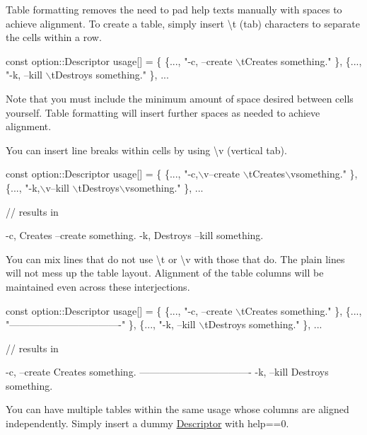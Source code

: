 Table formatting removes the need to pad help texts manually with spaces to achieve alignment. To create a table, simply insert \textbackslash{}t (tab) characters to separate the cells within a row.


\begin{DoxyCode}
\textcolor{keyword}{const} option::Descriptor usage[] = \{
\{..., \textcolor{stringliteral}{"-c, --create  \(\backslash\)tCreates something."} \},
\{..., \textcolor{stringliteral}{"-k, --kill  \(\backslash\)tDestroys something."} \}, ...
\end{DoxyCode}


Note that you must include the minimum amount of space desired between cells yourself. Table formatting will insert further spaces as needed to achieve alignment.

You can insert line breaks within cells by using \textbackslash{}v (vertical tab).


\begin{DoxyCode}
\textcolor{keyword}{const} option::Descriptor usage[] = \{
\{..., \textcolor{stringliteral}{"-c,\(\backslash\)v--create  \(\backslash\)tCreates\(\backslash\)vsomething."} \},
\{..., \textcolor{stringliteral}{"-k,\(\backslash\)v--kill  \(\backslash\)tDestroys\(\backslash\)vsomething."} \}, ...

\textcolor{comment}{// results in}

-c,       Creates
--create  something.
-k,       Destroys
--kill    something.
\end{DoxyCode}


You can mix lines that do not use \textbackslash{}t or \textbackslash{}v with those that do. The plain lines will not mess up the table layout. Alignment of the table columns will be maintained even across these interjections.


\begin{DoxyCode}
\textcolor{keyword}{const} option::Descriptor usage[] = \{
\{..., \textcolor{stringliteral}{"-c, --create  \(\backslash\)tCreates something."} \},
\{..., \textcolor{stringliteral}{"----------------------------------"} \},
\{..., \textcolor{stringliteral}{"-k, --kill  \(\backslash\)tDestroys something."} \}, ...

\textcolor{comment}{// results in}

-c, --create  Creates something.
----------------------------------
-k, --kill    Destroys something.
\end{DoxyCode}


You can have multiple tables within the same usage whose columns are aligned independently. Simply insert a dummy \hyperlink{struct_option_parser_1_1_descriptor}{Descriptor} with {\ttfamily help==0}.


